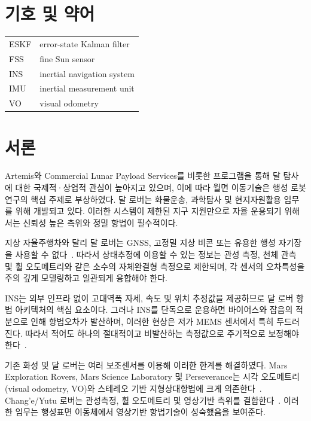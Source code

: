 \documentclass[]{IAC_style}
\begin{document}

\maketitle
\thispagestyle{fancy}

\section*{기호 및 약어}
\begin{tabular}{@{}ll@{}}
ESKF & error-state Kalman filter \\
FSS & fine Sun sensor \\
INS & inertial navigation system \\
IMU & inertial measurement unit \\
VO & visual odometry \\
\end{tabular}


\section{서론}

Artemis와 Commercial Lunar Payload Services를 비롯한 프로그램을 통해 달 탐사에 대한 국제적·상업적 관심이 높아지고 있으며, 이에 따라 월면 이동기술은 행성 로봇 연구의 핵심 주제로 부상하였다. 달 로버는 화물운송, 과학탐사 및 현지자원활용 임무를 위해 개발되고 있다. 이러한 시스템이 제한된 지구 지원만으로 자율 운용되기 위해서는 신뢰성 높은 측위와 정밀 항법이 필수적이다.

지상 자율주행차와 달리 달 로버는 GNSS, 고정밀 지상 비콘 또는 유용한 행성 자기장을 사용할 수 없다~\cite{ilyas2016integrated}. 따라서 상태추정에 이용할 수 있는 정보는 관성 측정, 천체 관측 및 휠 오도메트리와 같은 소수의 자체완결형 측정으로 제한되며, 각 센서의 오차특성을 주의 깊게 모델링하고 일관되게 융합해야 한다.

INS는 외부 인프라 없이 고대역폭 자세, 속도 및 위치 추정값을 제공하므로 달 로버 항법 아키텍처의 핵심 요소이다. 그러나 INS를 단독으로 운용하면 바이어스와 잡음의 적분으로 인해 항법오차가 발산하며, 이러한 현상은 저가 MEMS 센서에서 특히 두드러진다. 따라서 적어도 하나의 절대적이고 비발산하는 측정값으로 주기적으로 보정해야 한다~\cite{titterton2004strapdown,groves2013principles}.

기존 화성 및 달 로버는 여러 보조센서를 이용해 이러한 한계를 해결하였다. Mars Exploration Rovers, Mars Science Laboratory 및 Perseverance는 시각 오도메트리(visual odometry, VO)와 스테레오 기반 지형상대항법에 크게 의존한다~\cite{maimone2007mer,rankin2021curiosity,maki2020mars2020}. Chang'e/Yutu 로버는 관성측정, 휠 오도메트리 및 영상기반 측위를 결합한다~\cite{ma2020yutu2}. 이러한 임무는 행성표면 이동체에서 영상기반 항법기술이 성숙했음을 보여준다.
\end{document}
